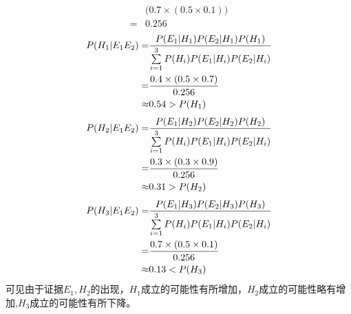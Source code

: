 \begin{answer}
\begin{subanswer}
\begin{align*}
    &\big(0.7 \times (0.5 \times 0.1)\big) \\
    =&0.256
    \end{align*}
    \begin{align}
    P(H_1|E_1E_2)=& \frac{P(E_1|H_1)P(E_2|H_1)P(H_1)} {\sum\limits_{i=1}^{3}P(H_i)P(E_1|H_i)P(E_2|H_i)} \notag\\
    =&\frac{0.4 \times (0.5 \times 0.7)}{0.256} \notag\\
    \approx&0.54>P(H_1)
    \end{align}
    \begin{align}
    P(H_2|E_1E_2)=& \frac{P(E_1|H_2)P(E_2|H_2)P(H_2)} {\sum\limits_{i=1}^{3}P(H_i)P(E_1|H_i)P(E_2|H_i)} \notag\\
    =&\frac{0.3 \times (0.3 \times 0.9)}{0.256} \notag\\
    \approx&0.31>P(H_2)
    \end{align}
    \begin{align}
    P(H_3|E_1E_2)=& \frac{P(E_1|H_3)P(E_2|H_3)P(H_3)} {\sum\limits_{i=1}^{3}P(H_i)P(E_1|H_i)P(E_2|H_i)} \notag\\
    =&\frac{0.7 \times (0.5 \times 0.1)}{0.256} \notag\\
    \approx&0.13<P(H_3)
    \end{align}
    可见由于证据$E_1,H_2$的出现，$H_1$成立的可能性有所增加，$H_2$成立的可能性略有增加,$H_3$成立的可能性有所下降。
\end{subanswer}
\end{answer}
